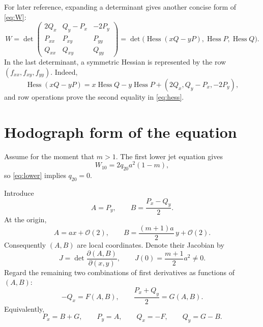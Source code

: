 \documentclass[11pt]{article}
\theoremstyle{remark}
\newcommand{\Hess}{\operatorname{Hess}}
\newcommand{\cO}{\mathcal O}
\begin{document}
For later reference, expanding a determinant gives another concise form of
\eqref{eq:W}:
\begin{equation}
 W=\det\!\begin{pmatrix}
 2Q_x&Q_y-P_x&-2P_y\\
 P_{xx}&P_{xy}&P_{yy}\\
 Q_{xx}&Q_{xy}&Q_{yy}
 \end{pmatrix}
 =\det\bigl(\Hess(xQ-yP),\Hess P,\Hess Q\bigr).       \label{eq:hess}
\end{equation}
In the last determinant, a symmetric Hessian is represented by the row
\((f_{xx},f_{xy},f_{yy})\).  Indeed,
\[
 \Hess(xQ-yP)=x\Hess Q-y\Hess P
                 +(2Q_x,Q_y-P_x,-2P_y),
\]
and row operations prove the second equality in \eqref{eq:hess}.

\section{Hodograph form of the equation}                         \label{sec:hodograph}

Assume for the moment that \(m>1\).  The first lower jet equation gives
\begin{equation}
                       W_{10}=2q_{20}a^2(1-m),                     \label{eq:W10}
\end{equation}
so \eqref{eq:lower} implies \(q_{20}=0\).

Introduce
\begin{equation}
 A=P_y,\qquad B=\frac{P_x-Q_y}{2}.                                 \label{eq:AB}
\end{equation}
At the origin,
\begin{equation}
 A=ax+\cO(2),\qquad
 B=\frac{(m+1)a}{2}\,y+\cO(2).                                   \label{eq:ABlinear}
\end{equation}
Consequently \((A,B)\) are local coordinates.  Denote their Jacobian by
\begin{equation}
 J=\det\frac{\partial(A,B)}{\partial(x,y)},\qquad
 J(0)=\frac{m+1}{2}a^2\ne0.                                      \label{eq:J}
\end{equation}
Regard the remaining two combinations of first derivatives as functions of
\((A,B)\):
\begin{equation}
 -Q_x=F(A,B),\qquad \frac{P_x+Q_y}{2}=G(A,B).                      \label{eq:FG}
\end{equation}
Equivalently,
\begin{equation}
 P_x=B+G,\qquad P_y=A,\qquad Q_x=-F,\qquad Q_y=G-B.                \label{eq:first}
\end{equation}
\end{document}
